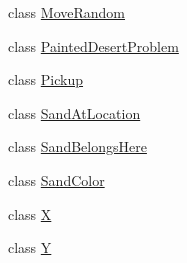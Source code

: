 \begin{DoxyCompactItemize}
\item 
class \hyperlink{classexamples_1_1gp_1_1painted_desert_1_1_move_random}{Move\-Random}
\item 
class \hyperlink{classexamples_1_1gp_1_1painted_desert_1_1_painted_desert_problem}{Painted\-Desert\-Problem}
\item 
class \hyperlink{classexamples_1_1gp_1_1painted_desert_1_1_pickup}{Pickup}
\item 
class \hyperlink{classexamples_1_1gp_1_1painted_desert_1_1_sand_at_location}{Sand\-At\-Location}
\item 
class \hyperlink{classexamples_1_1gp_1_1painted_desert_1_1_sand_belongs_here}{Sand\-Belongs\-Here}
\item 
class \hyperlink{classexamples_1_1gp_1_1painted_desert_1_1_sand_color}{Sand\-Color}
\item 
class \hyperlink{classexamples_1_1gp_1_1painted_desert_1_1_x}{X}
\item 
class \hyperlink{classexamples_1_1gp_1_1painted_desert_1_1_y}{Y}
\end{DoxyCompactItemize}
